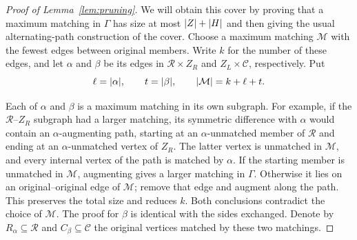 \begin{proof}[Proof of Lemma~\ref{lem:pruning}]
We will obtain this cover by proving that a maximum matching in $\Gamma$
has size at most $\lvert Z\rvert+\lvert H\rvert$ and then giving the usual alternating-path
construction of the cover.  Choose a maximum matching $\mathcal M$ with
the fewest edges between original members.  Write $k$ for the number of
these edges, and let $\alpha$ and $\beta$ be its edges in
$\mathcal R\times Z_R$ and $Z_L\times\mathcal C$, respectively.  Put
\[
 \ell=\lvert \alpha\rvert,\qquad t=\lvert \beta\rvert,
 \qquad\lvert \mathcal M\rvert=k+\ell+t.
\]

Each of $\alpha$ and $\beta$ is a maximum matching in its own subgraph.
For example, if the $\mathcal R$--$Z_R$ subgraph had a larger matching,
its symmetric difference with $\alpha$ would contain an
$\alpha$-augmenting path, starting at an $\alpha$-unmatched member of
$\mathcal R$ and ending at an $\alpha$-unmatched vertex of $Z_R$.
The latter vertex is unmatched in $\mathcal M$, and every internal vertex
of the path is matched by $\alpha$.  If the starting member is unmatched
in $\mathcal M$, augmenting gives a larger matching in $\Gamma$.
Otherwise it lies on an original--original edge of $\mathcal M$;
remove that edge and augment along the path.  This preserves the total
size and reduces $k$.  Both conclusions contradict the choice of
$\mathcal M$.  The proof for $\beta$ is identical with the sides
exchanged.  Denote by $R_\alpha\subseteq\mathcal R$ and
$C_\beta\subseteq\mathcal C$ the original vertices matched by these
two matchings.


\end{proof}
